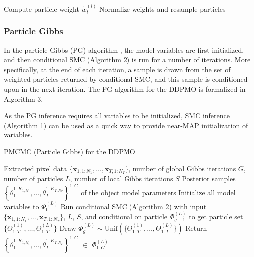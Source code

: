 \documentclass{article}
\begin{document}
\begin{algorithm}[H]
\begin{algorithmic}[1]
                \ENDIF
                \STATE Compute particle weight $\tilde{w}_{t}^{(l)}$
            \ENDFOR
                    \STATE Normalize weights and resample particles
                \ENDIF
            \ENDFOR
        \ENDFOR
    \end{algorithmic}
\end{algorithm}

\subsubsection{Particle Gibbs}
In the particle Gibbs (PG) algorithm \cite{andrieu2010particle}, the model variables are first initialized, and then conditional SMC (Algorithm 2) is run for a number of iterations. More specifically, at the end of each iteration, a sample is drawn from the set of weighted particles returned by conditional SMC, and this sample is conditioned upon in the next iteration. The PG algorithm for the DDPMO is formalized in Algorithm 3.

As the PG inference requires all variables to be initialized, SMC inference (Algorithm 1) can be used as a quick way to provide near-MAP initialization of variables.

\begin{algorithm}[h]
   \caption{PMCMC (Particle Gibbs) for the DDPMO}
   \label{alg:SMC}
   \begin{algorithmic}[1]
   \REQUIRE Extracted pixel data $\{ \mathbf{x}_{1,1:N_1},\ldots,\mathbf{x}_{T,1:N_T} \}$, 
        number of global Gibbs iterations $G$,
        number of particles $L$, 
        number of local Gibbs iterations $S$
    \ENSURE Posterior samples $\left\{\theta_1^{1:K_{1,N_1}},\ldots,\theta_T^{1:K_{T,N_T}}\right\}^{1:G}$
        of the object model parameters
        \STATE Initialize all model variables to $\Phi_0^{(L)}$
        \STATE Run conditional SMC (Algorithm 2) with input $\{ \mathbf{x}_{1,1:N_1},\ldots,\mathbf{x}_{T,1:N_T} \}$, 
            $L$, $S$, and conditional on particle $\Phi_{g-1}^{(L)}$ to get particle set 
                $\{\Theta_{1:T}^{(1)},\ldots,\Theta_{1:T}^{(L)}\}$
        \STATE Draw $\Phi_g^{(L)} \sim \text{Unif}(\{\Theta_{1:T}^{(1)},\ldots,\Theta_{1:T}^{(L)}\})$
    \ENDFOR
    \STATE Return $\left\{\theta_1^{1:K_{1,N_1}},\ldots,\theta_T^{1:K_{T,N_T}}\right\}^{1:G}$
        $\in$ $\Phi_{1:G}^{(L)}$
    \end{algorithmic}
\end{algorithm}
\end{document}
